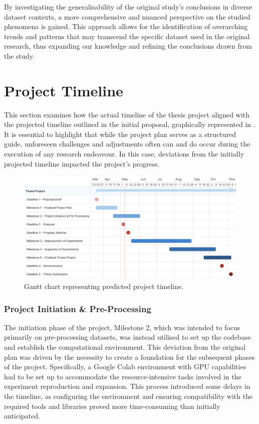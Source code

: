 By investigating the generalisability of the original study's conclusions in diverse dataset contexts, a more comprehensive and nuanced perspective on the studied phenomena is gained. This approach allows for the identification of overarching trends and patterns that may transcend the specific dataset used in the original research, thus expanding our knowledge and refining the conclusions drawn from the study. 

\section{Project Timeline}
This section examines how the actual timeline of the thesis project aligned with the projected timeline outlined in the initial proposal, graphically represented in . It is essential to highlight that while the project plan serves as a structured guide, unforeseen challenges and adjustments often can and do occur during the execution of any research endeavour. In this case, deviations from the initially projected timeline impacted the project's progress.

\begin{figure}[h]
    \centering
    \includegraphics[width=\textwidth]{1Introduction/GanttChart.png}
    \caption{Gantt chart representing predicted project timeline.}
    \label{fig:gantt}
\end{figure}

\subsubsection{Project Initiation \& Pre-Processing}
The initiation phase of the project, Milestone 2, which was intended to focus primarily on pre-processing datasets, was instead utilised to set up the codebase and establish the computational environment. This deviation from the original plan was driven by the necessity to create a foundation for the subsequent phases of the project. Specifically, a Google Colab environment with GPU capabilities had to be set up to accommodate the resource-intensive tasks involved in the experiment reproduction and expansion. This process introduced some delays in the timeline, as configuring the environment and ensuring compatibility with the required tools and libraries proved more time-consuming than initially anticipated.

